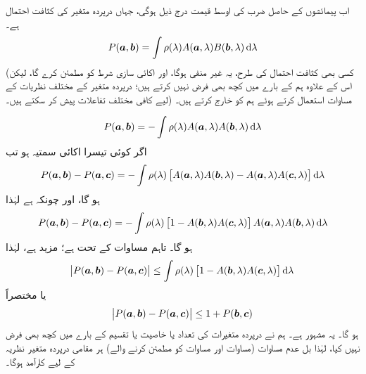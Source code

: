 اب پیمائشوں کے حاصل ضرب کی اوسط قیمت درج ذیل ہوگی، جہاں  درپردہ متغیر کی کثافت احتمال ہے۔
\begin{align}
	P(\kvec{a}, \kvec{b}) = \int\rho(\lambda)A(\kvec{a}, \lambda)B(\kvec{b}, \lambda)\dif\lambda
\end{align}
(کسی بھی کثافت احتمال کی طرح، یہ غیر منفی ہوگا، اور اکائی سازی شرط  کو مطمئن کرے گا، لیکن اس کے علاوہ ہم  کے بارے میں کچھ بھی فرض نہیں کرتے ہیں؛ درپردہ متغیر کے مختلف نظریات  کے لیے کافی مختلف تفاعلات پیش کر سکتے ہیں۔) مساوات  استعمال کرتے ہوئے ہم  کو خارج کرتے ہیں۔


\begin{align}
	P(\kvec{a}, \kvec{b}) = -\int\rho(\lambda)A(\kvec{a}, \lambda)A(\kvec{b}, \lambda)\dif\lambda
\end{align}
اگر  کوئی تیسرا اکائی سمتیہ ہو تب
\begin{align}
	P(\kvec{a}, \kvec{b})-P(\kvec{a}, \kvec{c}) = -\int\rho(\lambda)\left[A(\kvec{a}, \lambda)A(\kvec{b}, \lambda)-A(\kvec{a}, \lambda)A(\kvec{c}, \lambda)\right]\dif\lambda
\end{align}
ہو گا، اور چونکہ  ہے لہٰذا 
\begin{align}
	P(\kvec{a}, \kvec{b})-P(\kvec{a}, \kvec{c}) =-\int\rho(\lambda)\left[1-A(\kvec{b}, \lambda)A(\kvec{c}, \lambda)\right]A(\kvec{a}, \lambda)A(\kvec{b}, \lambda)\dif\lambda
\end{align}
ہو گا۔ تاہم مساوات  کے تحت ہے؛ مزید
 ہے، لہٰذا 
\begin{align}
	\abs{P(\kvec{a}, \kvec{b})-P(\kvec{a},\kvec{c})}\leq\int\rho(\lambda)\left[1-A(\kvec{b}, \lambda)A(\kvec{c}, \lambda)\right]\dif\lambda
\end{align}
یا مختصراً 
\begin{align}
	\abs{P({{\boldsymbol{a}}}, {{\boldsymbol{b}}})-P({{\boldsymbol{a}}}, {{\boldsymbol{c}}})}\leq1+P({{\boldsymbol{b}}}, {{\boldsymbol{c}}})
\end{align}
ہو گا۔ یہ مشہور  ہے۔ ہم نے درپردہ متغیرات کی تعداد یا خاصیت یا تقسیم  کے بارے میں کچھ بھی فرض نہیں کیا، لہٰذا بل عدم مساوات (مساوات  اور مساوات  کو مطمئن کرنے والے) ہر مقامی درپردہ متغیر نظریہ کے لیے کارآمد ہوگا۔

